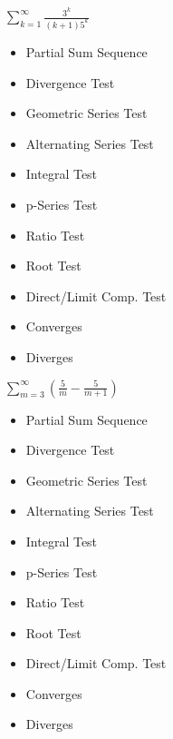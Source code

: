 \documentclass[12pt]{article}
\newcommand{\<}{\left\langle}
\renewcommand{\>}{\right\rangle}
\begin{document}
\begin{multicols}{3}
\(\sum_{k=1}^\infty\frac{3^k}{(k+1)5^k}\)

\vspace{1em}

\begin{itemize}\footnotesize
\item Partial Sum Sequence
\item Divergence Test
\item Geometric Series Test
\item Alternating Series Test
\item Integral Test
\item p-Series Test
\item Ratio Test
\item Root Test
\item Direct/Limit Comp. Test
\end{itemize}

\vspace{1em}

\begin{itemize}\footnotesize
\item Converges
\item Diverges
\end{itemize}

\columnbreak

\(\sum_{m=3}^\infty(\frac{5}{m}-\frac{5}{m+1})\)

\vspace{1em}

\begin{itemize}\footnotesize
\item Partial Sum Sequence
\item Divergence Test
\item Geometric Series Test
\item Alternating Series Test
\item Integral Test
\item p-Series Test
\item Ratio Test
\item Root Test
\item Direct/Limit Comp. Test
\end{itemize}

\vspace{1em}

\begin{itemize}\footnotesize
\item Converges
\item Diverges
\end{itemize}


\end{multicols}
\end{document}
